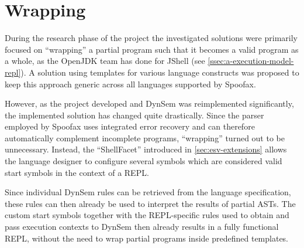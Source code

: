 \section{Wrapping}
\label{sec:wrapping}

During the research phase of the project the investigated solutions were
primarily focused on ``wrapping'' a partial program such that it becomes a
valid program as a whole, as the OpenJDK team has done for JShell (see
\cref{ssec:a-execution-model-repl}). A solution using templates for various
language constructs was proposed to keep this approach generic across all
languages supported by Spoofax.

However, as the project developed and DynSem was reimplemented significantly,
the implemented solution has changed quite drastically. Since the
parser employed by Spoofax uses integrated error recovery and can therefore
automatically complement incomplete programs, ``wrapping'' turned out to be
unnecessary. Instead, the ``ShellFacet'' introduced in \cref{sec:esv-extensions}
allows the language designer to configure several symbols which are
considered valid start symbols in the context of a REPL.

Since individual DynSem rules can be retrieved from the language specification,
these rules can then already be used to interpret the results of partial ASTs.
The custom start symbols together with the REPL-specific rules used to obtain
and pass execution contexts to DynSem then already results in a fully functional
REPL, without the need to wrap partial programs inside predefined templates.


